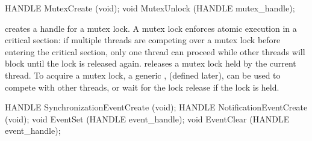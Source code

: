 


\begin{paldef}
HANDLE MutexCreate (void);
void   MutexUnlock (HANDLE mutex_handle);
\end{paldef}


 creates a handle for a mutex lock.
A mutex lock enforces atomic execution in a critical section:
if multiple threads are competing over a mutex lock
before entering the critical section,
only one thread can proceed while other threads will block until the lock is released again.
 releases a mutex lock held
by the current thread.
To acquire a mutex lock,
a generic \hostapi{},
 (defined later),
can be used to compete with other threads,
or wait for the lock release if the lock is held.



\begin{paldef}
HANDLE SynchronizationEventCreate (void);
HANDLE NotificationEventCreate    (void);
void   EventSet   (HANDLE event_handle);
void   EventClear (HANDLE event_handle);
\end{paldef}






